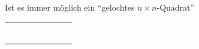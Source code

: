 \begin{bsp}
\begin{rk}
%
%
%
%
%
%
\end{rk}
\end{bsp}


\begin{bsp}\label{bsp:plättli}
Ist es immer möglich ein ``gelochtes $n\times n$-Quadrat''
\begin{center}
\begin{tabular}{ | c | c | c | c | c  | c | c | c | }
\hline
&&&&&&&\\
\hline
&&&&&&&\\
\hline
&&&&&&&\\
\hline
&&&&&&&\\
\hline
&&&&&&\cellcolor{black}&\\
\hline
&&&&&&&\\
\hline
&&&&&&&\\
\hline
&&&&&&&\\
\hline
\end{tabular}
\end{center}


\end{bsp}
